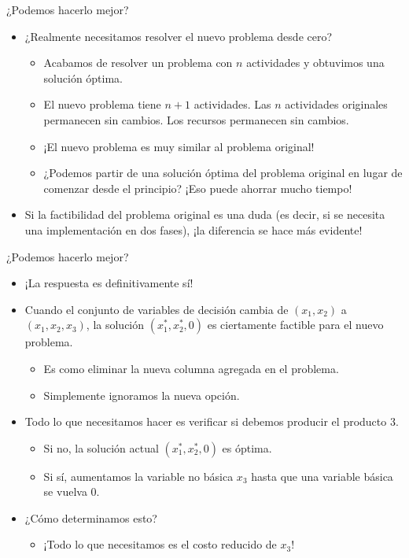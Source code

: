 \documentclass{beamer}
\begin{document}
\begin{frame}{¿Podemos hacerlo mejor?}
    \begin{itemize}
        \item ¿Realmente necesitamos resolver el nuevo problema desde cero?
        \begin{itemize}
            \item Acabamos de resolver un problema con \(n\) actividades y obtuvimos una solución óptima.
            \item El nuevo problema tiene \(n + 1\) actividades. Las \(n\) actividades originales permanecen sin cambios. Los recursos permanecen sin cambios.
            \item ¡El nuevo problema es muy similar al problema original!
            \item ¿Podemos partir de una solución óptima del problema original en lugar de comenzar desde el principio? ¡Eso puede ahorrar mucho tiempo!
        \end{itemize}
        
        \item Si la factibilidad del problema original es una duda (es decir, si se necesita una implementación en dos fases), ¡la diferencia se hace más evidente!
    \end{itemize}
\end{frame}

\begin{frame}{¿Podemos hacerlo mejor?}
    \begin{itemize}
        \item ¡La respuesta es definitivamente sí!
        
        \item Cuando el conjunto de variables de decisión cambia de \( (x_1, x_2) \) a \( (x_1, x_2, x_3) \), la solución \( (x_1^*, x_2^*, 0) \) es ciertamente factible para el nuevo problema.
        \begin{itemize}
            \item Es como eliminar la nueva columna agregada en el problema.
            \item Simplemente ignoramos la nueva opción.
        \end{itemize}
        
        \item Todo lo que necesitamos hacer es verificar si debemos producir el producto 3.
        \begin{itemize}
            \item Si no, la solución actual \( (x_1^*, x_2^*, 0) \) es óptima.
            \item Si sí, aumentamos la variable no básica \( x_3 \) hasta que una variable básica se vuelva 0.
        \end{itemize}
        
        \item ¿Cómo determinamos esto?
        \begin{itemize}
            \item ¡Todo lo que necesitamos es el costo reducido de \(x_3\)!
        \end{itemize}
    \end{itemize}
\end{frame}
\end{document}
